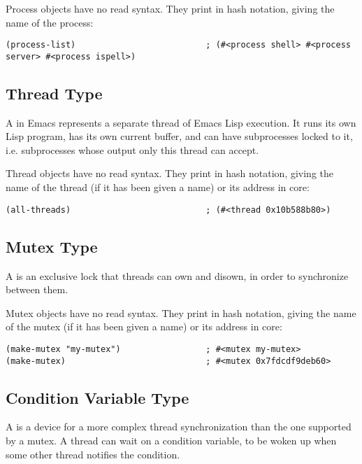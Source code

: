 Process objects have no read syntax.
They print in hash notation, giving the name of the process:
\begin{lstlisting}
(process-list)                          ; (#<process shell> #<process server> #<process ispell>)
\end{lstlisting}


\subsection{Thread Type}
\label{sec:thread-type}

A  in Emacs represents a separate thread of Emacs Lisp execution.
It runs its own Lisp program, has its own current buffer, and can have subprocesses locked to it, i.e. subprocesses whose output only this thread can accept.

Thread objects have no read syntax.
They print in hash notation, giving the name of the thread (if it has been given a name) or its address in core:
\begin{lstlisting}
(all-threads)                           ; (#<thread 0x10b588b80>)
\end{lstlisting}


\subsection{Mutex Type}
\label{sec:mutex-type}

A  is an exclusive lock that threads can own and disown, in order to synchronize between them.

Mutex objects have no read syntax.
They print in hash notation, giving the name of the mutex (if it has been given a name) or its address in core:
\begin{lstlisting}
(make-mutex "my-mutex")                 ; #<mutex my-mutex>
(make-mutex)                            ; #<mutex 0x7fdcdf9deb60>
\end{lstlisting}

\subsection{Condition Variable Type}
\label{sec:cond-vari-type}

A  is a device for a more complex thread synchronization than the one supported by a mutex.
A thread can wait on a condition variable, to be woken up when some other thread notifies the condition.


